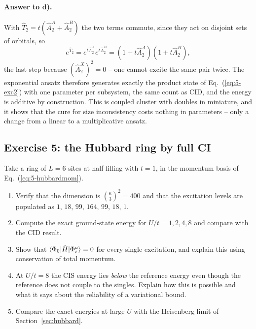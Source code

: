 \paragraph{Answer to d).}
With $\hat{T}_2 = t\left(\hat{A}_2^A+\hat{A}_2^B\right)$ the two terms commute,
since they act on disjoint sets of orbitals, so
\begin{equation}
  e^{\hat{T}_2} = e^{t\hat{A}_2^A}e^{t\hat{A}_2^B}
  = \left(1+t\hat{A}_2^A\right)\left(1+t\hat{A}_2^B\right),
  \label{eq:5-exc3}
\end{equation}
the last step because $(\hat{A}_2^X)^2=0$ -- one cannot excite the same pair
twice.  The exponential ansatz therefore generates exactly the product state
of Eq.~(\ref{eq:5-exc2}) with one parameter per subsystem, the same count as
CID, and the energy is additive by construction.  This is coupled cluster with
doubles in miniature, and it shows that the cure for size inconsistency costs
nothing in parameters -- only a change from a linear to a multiplicative
ansatz.

\subsection*{Exercise 5: the Hubbard ring by full CI}
\label{ex:5-hubbardfci}

Take a ring of $L=6$ sites at half filling with $t=1$, in the momentum basis
of Eq.~(\ref{eq:5-hubbardmom}).

\begin{enumerate}
  \item[a)] Verify that the dimension is $\binom{6}{3}^2=400$ and that the
  excitation levels are populated as $1$, $18$, $99$, $164$, $99$, $18$, $1$.
  \item[b)] Compute the exact ground-state energy for $U/t=1,2,4,8$ and
  compare with the CID result.
  \item[c)] Show that $\langle \Phi_0 | \hat{H} | \Phi_i^a \rangle=0$ for every single
  excitation, and explain this using conservation of total momentum.
  \item[d)] At $U/t=8$ the CIS energy lies \emph{below} the reference energy
  even though the reference does not couple to the singles.  Explain how this
  is possible and what it says about the reliability of a variational bound.
  \item[e)] Compare the exact energies at large $U$ with the Heisenberg limit
  of Section~\ref{sec:hubbard}.
\end{enumerate}

